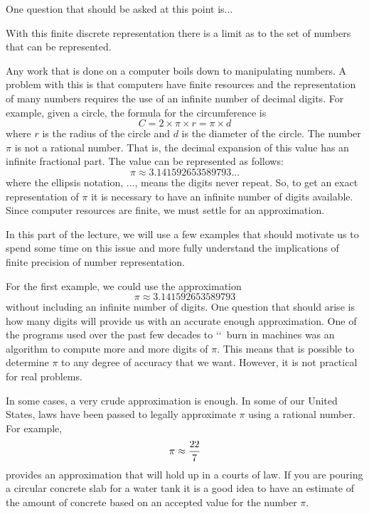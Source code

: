 \documentclass[10pt,fleqn]{article}
\begin{document}
One question that should be asked at this point is...







With this finite discrete representation there is a limit as to the set of
numbers that can be represented.














Any work that is done on a computer boils down to manipulating numbers. A
problem with this is that computers have finite resources and the representation
of many numbers requires the use of an infinite number of decimal digits. For
example, given a circle, the formula for the circumference is
$$C = 2 \times \pi \times r = \pi \times d$$
where $r$ is the radius of the circle and $d$ is the diameter of the circle. The
number $\pi$ is not a rational number. That is, the decimal expansion of this
value has an infinite fractional part. The value can be represented as follows:
$$\pi\approx 3.141592653589793...$$
where the ellipsis notation, $...$, means the digits never repeat. So, to get an
exact representation of $\pi$ it is necessary to have an infinite number of
digits available. Since computer resources are finite, we must settle for an
approximation.

In this part of the lecture, we will use a few examples that should motivate us
to spend some time on this issue and more fully understand the implications of
finite precision of number representation.

For the first example, we could use the approximation
$$\pi\approx 3.141592653589793$$
without including an infinite number of digits. One question that should arise
is how many digits will provide us with an accurate enough approximation. One
of the programs used over the past few decades to \lq\lq\ burn in machines was
an algorithm to compute more and more digits of $\pi$. This means that is
possible to determine $\pi$ to any degree of accuracy that we want. However, it
is not practical for real problems.

In some cases, a very crude approximation is enough. In some of our United
States, laws have been passed to legally approximate $\pi$ using a rational
number. For example,
$$\pi\approx {{22}\over 7}$$
provides an approximation that will hold up in a courts of law. If you are
pouring a circular concrete slab for a water tank it is a good idea to have an
estimate of the amount of concrete based on an accepted value for the number
$\pi$.
\end{document}

